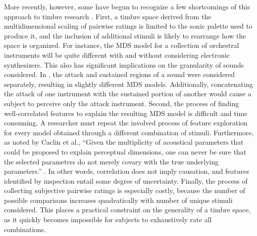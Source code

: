 More recently, however, some have begun to recognize a few shortcomings of this approach to timbre research \cite{Glennon2014}.
First, a timbre space derived from the multidimensional scaling of pairwise ratings is limited to the sonic palette used to produce it, and the inclusion of additional stimuli is likely to rearrange how the space is organized.
For instance, the MDS model for a collection of orchestral instruments will be quite different with and without considering electronic synthesizers.
This also has significant implications on the granularity of sounds considered.
In \cite{Krumhansl1980?}, the attack and sustained regions of a sound were considered separately, resulting in slightly different MDS models.
Additionally, concatenating the attack of one instrument with the sustained portion of another would cause a subject to perceive only the attack instrument.
Second, the process of finding well-correlated features to explain the resulting MDS model is difficult and time consuming.
A researcher must repeat the involved process of feature exploration for every model obtained through a different combination of stimuli.
Furthermore, as noted by Caclin et al., ``Given the multiplicity of acoustical parameters that could be proposed to explain perceptual dimensions, one can never be sure that the selected parameters do not merely covary with the true underlying parameters.'' \cite{Caclin2005}.
In other words, correlation does not imply causation, and features identified by inspection entail some degree of uncertainty.
Finally, the process of collecting subjective pairwise ratings is especially costly, because the number of possible comparisons increases quadratically with number of unique stimuli considered.
This places a practical constraint on the generality of a timbre space, as it quickly becomes impossible for subjects to exhaustively rate all combinations.





